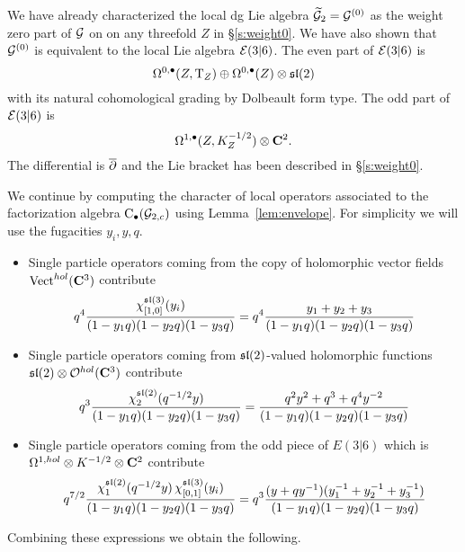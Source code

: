 We have already characterized the local dg Lie algebra $\widetilde {\mathcal G}_{2} = \mathcal G^{(0)}$ as the weight zero part of $\mathcal G$ on on any threefold $Z$ in \S\ref{s:weight0}. 
We have also shown that $\mathcal G^{(0)}$ is equivalent to the local Lie algebra $\mathcal E(3|6)$. 
The even part of $\mathcal E(3|6)$ is
\[
\Omega^{0,\bullet}(Z, {\rm T}_Z) \oplus \Omega^{0,\bullet}(Z) \otimes \mathfrak{sl}(2) 
\]
with its natural cohomological grading by Dolbeault form type. 
The odd part of $\mathcal E(3|6)$ is
\[
\Omega^{1,\bullet}(Z, K_Z^{-1/2}) \otimes \mathbf{C}^2 .
\]
The differential is $\overline{\partial}$ and the Lie bracket has been described in \S\ref{s:weight0}.


\parsec

We continue by computing the character of local operators associated to the factorization algebra ${\rm C}_\bullet(\mathcal G_{2,c})$ using Lemma~\ref{lem:envelope}.
For simplicity we will use the fugacities $y_i, y, q$.

\begin{itemize}
\item Single particle operators coming from the copy of holomorphic vector fields $\operatorname{Vect}^{hol}(\mathbf{C}^3)$ contribute
\[
q^4 \frac{\chi^{\mathfrak{sl}(3)}_{[1,0]}(y_i)}{(1-y_1q) (1-y_2 q) (1-y_3 q)}  = q^4 \frac{y_1 + y_2 + y_3}{(1-y_1q) (1-y_2 q) (1-y_3 q)} 
\]
\item Single particle operators coming from $\mathfrak{sl}(2)$-valued holomorphic functions $\mathfrak{sl}(2) \otimes \mathcal O^{hol}(\mathbf{C}^3)$ contribute
\[
q^3 \frac{\chi_2^{\mathfrak{sl}(2)} (q^{-1/2}y)}{(1-y_1q) (1-y_2 q) (1-y_3 q)}  = \frac{q^2 y^2 + q^3 + q^4 y^{-2}}{(1-y_1q) (1-y_2 q) (1-y_3 q)} 
\]
\item Single particle operators coming from the odd piece of $E(3|6)$ which is $\Omega^{1,hol} \otimes K^{-1/2} \otimes \mathbf{C}^2$ contribute
\[
q^{7/2}\frac{\chi^{\mathfrak{sl}(2)}_{1}(q^{-1/2} y) \, \chi_{[0,1]}^{\mathfrak{sl}(3)} (y_i)}{(1-y_1q) (1-y_2 q) (1-y_3 q)} = q^{3}\frac{(y + q y^{-1})(y_1^{-1} + y_2^{-1} + y_3^{-1})}{(1-y_1q) (1-y_2 q) (1-y_3 q)} 
\]
\end{itemize}

Combining these expressions we obtain the following.

